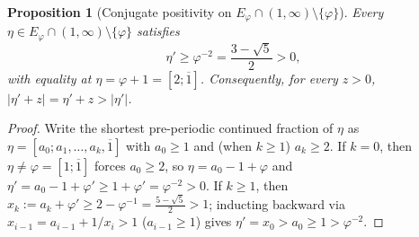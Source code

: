 \documentclass[11pt]{amsart}
\newtheorem{proposition}[theorem]{Proposition}
\theoremstyle{definition}
\theoremstyle{remark}
\numberwithin{equation}{section}
\begin{document}
\begin{proposition}[Conjugate positivity on $E_\varphi\cap(1,\infty)\setminus\{\varphi\}$]\label{prop:conjugate-positivity}
Every $\eta\in E_\varphi\cap(1,\infty)\setminus\{\varphi\}$ satisfies
\[
 \eta'\ge\varphi^{-2}=\frac{3-\sqrt5}{2}>0,
\]
with equality at $\eta=\varphi+1=[2;\overline1]$. Consequently, for every
$z>0$, $|\eta'+z|=\eta'+z>|\eta'|$.
\end{proposition}
\begin{proof}
Write the shortest pre-periodic continued fraction of $\eta$ as
$\eta=[a_0;a_1,\ldots,a_k,\overline1]$ with $a_0\ge1$ and (when $k\ge1$)
$a_k\ge2$. If $k=0$, then $\eta\ne\varphi=[1;\overline1]$ forces $a_0\ge2$,
so $\eta=a_0-1+\varphi$ and $\eta'=a_0-1+\varphi'\ge 1+\varphi'=\varphi^{-2}>0$.
If $k\ge1$, then $x_k:=a_k+\varphi'\ge 2-\varphi^{-1}=\frac{5-\sqrt5}{2}>1$;
inducting backward via $x_{i-1}=a_{i-1}+1/x_i>1$ ($a_{i-1}\ge1$) gives
$\eta'=x_0>a_0\ge1>\varphi^{-2}$.
\end{proof}
\end{document}
